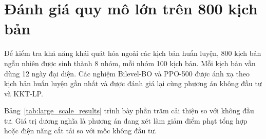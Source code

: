 \section{Đánh giá quy mô lớn trên 800 kịch bản}
\label{sec:large_scale_eval}

Để kiểm tra khả năng khái quát hóa ngoài các kịch bản huấn luyện, 800 kịch bản ngẫu nhiên được sinh thành 8 nhóm, mỗi nhóm 100 kịch bản. Mỗi kịch bản vẫn dùng 12 ngày đại diện. Các nghiệm Bilevel-BO và PPO-500 được ánh xạ theo kịch bản huấn luyện gần nhất và được đánh giá lại cùng phương án không đầu tư và KKT-LP.

Bảng~\ref{tab:large_scale_results} trình bày phần trăm cải thiện so với không đầu tư. Giá trị dương nghĩa là phương án đang xét làm giảm điểm phạt tổng hợp hoặc điện năng cắt tải so với mốc không đầu tư.

\begin{table}[!ht]
    \centering
    \caption{Kết quả đánh giá 800 kịch bản: phần trăm cải thiện so với không đầu tư.}
    \label{tab:large_scale_results}
    \scriptsize
\end{table}

